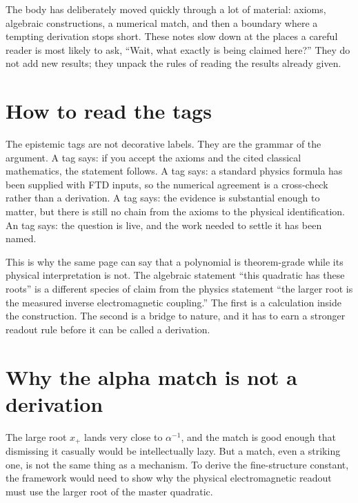 \noindent The body has deliberately moved quickly through a lot of material:
axioms, algebraic constructions, a numerical match, and then a boundary where a
tempting derivation stops short. These notes slow down at the places a careful
reader is most likely to ask, ``Wait, what exactly is being claimed here?'' They
do not add new results; they unpack the rules of reading the results already
given.

\section*{How to read the tags}

\noindent The epistemic tags are not decorative labels. They are the grammar of
the argument. A  tag says: if you accept the axioms and the cited
classical mathematics, the statement follows. A  tag says: a standard
physics formula has been supplied with FTD inputs, so the numerical agreement is
a cross-check rather than a derivation. A  tag says: the evidence is
substantial enough to matter, but there is still no chain from the axioms to the
physical identification. An  tag says: the question is live, and the
work needed to settle it has been named.

\medskip
\noindent This is why the same page can say that a polynomial is theorem-grade
while its physical interpretation is not. The algebraic statement
``this quadratic has these roots'' is a different species of claim from the
physics statement ``the larger root is the measured inverse electromagnetic
coupling.'' The first is a calculation inside the construction. The second is a
bridge to nature, and it has to earn a stronger readout rule before it can be
called a derivation.

\section*{Why the alpha match is not a derivation}

\noindent The large root $x_+$ lands very close to $\alpha^{-1}$, and the match
is good enough that dismissing it casually would be intellectually lazy. But a
match, even a striking one, is not the same thing as a mechanism. To derive the
fine-structure constant, the framework would need to show why the physical
electromagnetic readout must use the larger root of the master quadratic.

